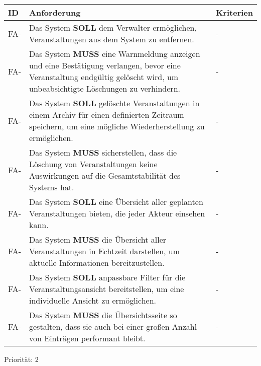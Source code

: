 \newpage

\begin{tabular} {|p{}|p{11cm}|p{}|}
	\hline
	ID & Anforderung & Kriterien \\
	\hline
	FA-
	& Das System \textbf{SOLL} dem Verwalter ermöglichen, Veranstaltungen aus dem System zu entfernen. 
	& - \\
	\hline
	FA-
	& Das System \textbf{MUSS} eine Warnmeldung anzeigen und eine Bestätigung verlangen, bevor eine Veranstaltung endgültig gelöscht wird, um unbeabsichtigte Löschungen zu verhindern. 
	& - \\
	\hline
	FA-
	& Das System \textbf{SOLL} gelöschte Veranstaltungen in einem Archiv für einen definierten Zeitraum speichern, um eine mögliche Wiederherstellung zu ermöglichen. 
	& - \\
	\hline
	FA-
	& Das System \textbf{MUSS} sicherstellen, dass die Löschung von Veranstaltungen keine Auswirkungen auf die Gesamtstabilität des Systems hat. 
	& - \\
	\hline
	FA-
	& Das System \textbf{SOLL} eine Übersicht aller geplanten Veranstaltungen bieten, die jeder Akteur einsehen kann. 
	& - \\
	\hline
	FA-
	& Das System \textbf{MUSS} die Übersicht aller Veranstaltungen in Echtzeit darstellen, um aktuelle Informationen bereitzustellen. 
	& - \\
	\hline
	FA-
	& Das System \textbf{SOLL} anpassbare Filter für die Veranstaltungsansicht bereitstellen, um eine individuelle Ansicht zu ermöglichen. 
	& - \\
	\hline
	FA-
	& Das System \textbf{MUSS} die Übersichtsseite so gestalten, dass sie auch bei einer großen Anzahl von Einträgen performant bleibt. 
	& - \\
	\hline
\end{tabular}
Priorität: 2

\newpage

